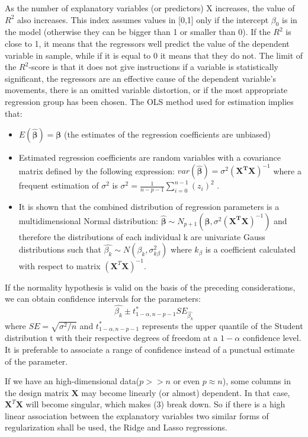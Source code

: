 \documentclass{emulateapj}
\begin{document}
As the number of explanatory variables (or predictors) X increases, the value of $R^2$ also increases.
This index assumes values in [0,1] only if the intercept $\beta_0$ is in the model (otherwise they can be bigger than 1 or smaller than 0).
If the $R^2$ is close to 1, it means that the regressors well predict the value of the dependent variable in sample, while if it is equal to 0 it means that they do not.
The limit of the $R^2$-score is that it does not give instructions if a variable is statistically significant, the
regressors are an effective cause of the dependent variable’s movements,
there is an omitted variable distortion, or if 
the most appropriate regression group has been chosen.
The OLS method used for estimation implies that:
\begin{itemize}
\item $E(\boldsymbol{\hat{\beta}})=\boldsymbol{\beta}$ (the estimates of the regression coefficients are unbiased)
\item Estimated regression coefficients are random variables with a covariance matrix defined by the following expression: $var(\boldsymbol{\hat{\beta}})=\sigma^2(\mathbf{X^TX})^{-1}$ where a frequent estimation of $\sigma^2$ is $\sigma^2=\frac{1}{n-p-1}\sum\limits_{i=0}^{n-1}(z_i)^2$ .
\item It is shown that the combined distribution of regression parameters is a multidimensional Normal distribution: $\boldsymbol{\hat{\beta}}\sim N_{p+1}(\boldsymbol{\beta},\sigma^2(\mathbf{X^TX})^{-1})$
 and therefore the distributions of each individual k are univariate Gauss distributions such that  $\hat{\beta_k}\sim N(\beta_k,\sigma^2_{k\beta})$
where $k_\beta$ is a coefficient calculated with respect to matrix $(\textbf{X}^T\textbf{X})^{-1}$.
 \end{itemize}
If the normality hypothesis is valid on the basis of the preceding considerations, we can obtain confidence intervals for the parameters:
\begin{equation}
\hat{\beta_k} \pm t^*_{1-\alpha,n-p-1}SE_{\hat{\beta_k}}
\end{equation}
where $SE=\sqrt{\sigma^2/n}$ and $t^*_{1-\alpha,n-p-1}$ represents the upper quantile of the Student distribution t with their respective degrees of freedom at a $1-\alpha$ confidence level. It is preferable to associate a range of confidence instead of a punctual estimate of the parameter.

If we have an high-dimensional data($p>>n$ or even $p\approx n$), some columns in the design matrix $\mathbf{X}$ may become linearly (or almost) dependent. In that case, $\mathbf{X}^T\mathbf{X}$ will become singular, which makes (3) break down. So if there is a high linear association between the explanatory variables two similar forms of regularization shall be used, the Ridge and Lasso regressions. 
\end{document}
